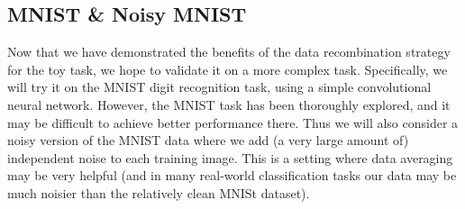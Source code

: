 \documentclass[11pt]{article}
\begin{document}
\subsection{MNIST \& Noisy MNIST}
Now that we have demonstrated the benefits of the data recombination strategy for the toy task, we hope to validate it on a more complex task. Specifically, we will try it on the MNIST digit recognition task, using a simple convolutional neural network. However, the MNIST task has been thoroughly explored, and it may be difficult to achieve better performance there. Thus we will also consider a noisy version of the MNIST data where we add (a very large amount of) independent noise to each training image. This is a setting where data averaging may be very helpful (and in many real-world classification tasks our data may be much noisier than the relatively clean MNISt dataset). 




\end{document}
